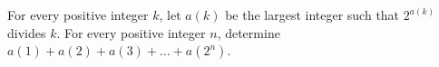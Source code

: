 \documentclass[varwidth]{standalone}
\begin{document}
    For every positive integer $k$, let $a(k)$ be the largest integer such that $2^{a(k)}$ divides $k$. For every positive integer $n$, determine $a(1) + a(2) + a(3) + \dots + a(2^n)$.
\end{document}
